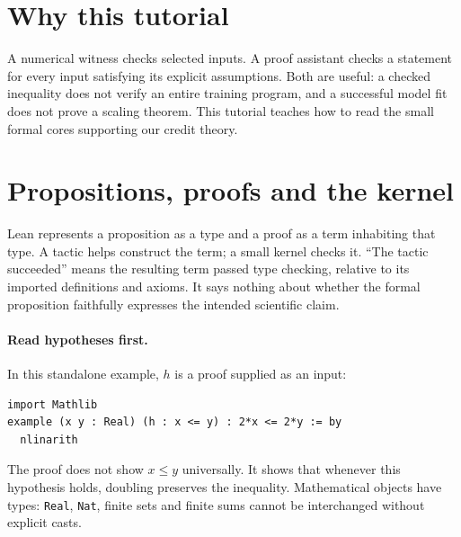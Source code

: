 \documentclass[11pt]{article}
\begin{document}
\section*{Why this tutorial}
A numerical witness checks selected inputs. A proof assistant checks a statement for every input satisfying its explicit assumptions. Both are useful: a checked inequality does not verify an entire training program, and a successful model fit does not prove a scaling theorem. This tutorial teaches how to read the small formal cores supporting our credit theory.
\section{Propositions, proofs and the kernel}
Lean represents a proposition as a type and a proof as a term inhabiting that type. A tactic helps construct the term; a small kernel checks it. ``The tactic succeeded'' means the resulting term passed type checking, relative to its imported definitions and axioms. It says nothing about whether the formal proposition faithfully expresses the intended scientific claim.
\paragraph{Read hypotheses first.} In this standalone example, $h$ is a proof supplied as an input:
\begin{verbatim}
import Mathlib
example (x y : Real) (h : x <= y) : 2*x <= 2*y := by
  nlinarith
\end{verbatim}
The proof does not show $x\le y$ universally. It shows that whenever this hypothesis holds, doubling preserves the inequality. Mathematical objects have types: \texttt{Real}, \texttt{Nat}, finite sets and finite sums cannot be interchanged without explicit casts.
\end{document}
